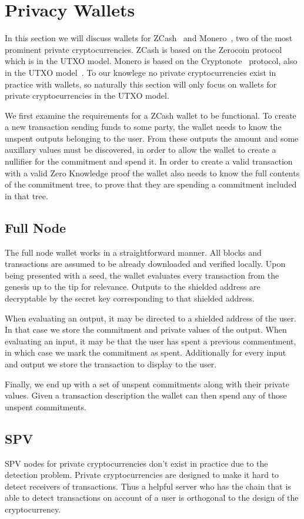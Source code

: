 \section{Privacy Wallets}
\label{privacy}
In this section we will discuss wallets for ZCash~\cite{zcash,zcash-spec} and Monero~\cite{monero}, two of the most prominent private cryptocurrencies. ZCash is based on the Zerocoin protocol~\cite{zerocoin} which is in the UTXO model. Monero is based on the Cryptonote~\cite{cryptonote} protocol, also in the UTXO model~\cite{zero-to-monero}. To our knowlege no private cryptocurrencies exist in practice with wallets, so naturally this section will only focus on wallets for private cryptocurrencies in the UTXO model.

We first examine the requirements for a ZCash wallet to be functional. To create a new transaction sending funds to some party, the wallet needs to know the unspent outputs belonging to the user. From these outputs the amount and some auxillary values must be discovered, in order to allow the wallet to create a nullifier for the commitment and spend it. In order to create a valid transaction with a valid Zero Knowledge proof the wallet also needs to know the full contents of the commitment tree, to prove that they are spending a commitment included in that tree.

\subsection{Full Node}
The full node wallet works in a straightforward manner. All blocks and transactions are assumed to be already downloaded and verified locally. Upon being presented with a seed, the wallet evaluates every transaction from the genesis up to the tip for relevance. Outputs to the shielded address are decryptable by the secret key corresponding to that shielded address.

When evaluating an output, it may be directed to a shielded address of the user. In that case we store the commitment and private values of the output. When evaluating an input, it may be that the user has spent a previous commentment, in which case we mark the commitment as spent. Additionally for every input and output we store the transaction to display to the user.

Finally, we end up with a set of unspent commitments along with their private values. Given a transaction description the wallet can then spend any of those unspent commitments.

\subsection{SPV}
SPV nodes for private cryptocurrencies don't exist in practice due to the detection problem. Private cryptocurrencies are designed to make it hard to detect receivers of transactions. Thus a helpful server who has the chain that is able to detect transactions on account of a user is orthogonal to the design of the cryptocurrency.

